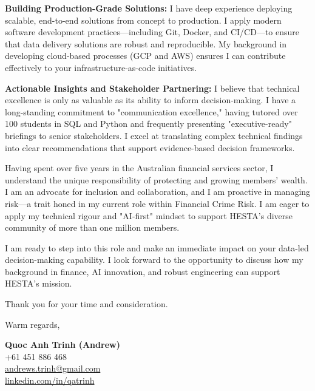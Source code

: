 \documentclass[11pt, a4paper]{article}
\begin{document}
\textbf{Building Production-Grade Solutions:}
I have deep experience deploying scalable, end-to-end solutions from concept to production. I apply modern software development practices—including Git, Docker, and CI/CD—to ensure that data delivery solutions are robust and reproducible. My background in developing cloud-based processes (GCP and AWS) ensures I can contribute effectively to your infrastructure-as-code initiatives.

\textbf{Actionable Insights and Stakeholder Partnering:}
I believe that technical excellence is only as valuable as its ability to inform decision-making. I have a long-standing commitment to "communication excellence," having tutored over 100 students in SQL and Python and frequently presenting "executive-ready" briefings to senior stakeholders. I excel at translating complex technical findings into clear recommendations that support evidence-based decision frameworks.

Having spent over five years in the Australian financial services sector, I understand the unique responsibility of protecting and growing members' wealth. I am an advocate for inclusion and collaboration, and I am proactive in managing risk—a trait honed in my current role within Financial Crime Risk. I am eager to apply my technical rigour and "AI-first" mindset to support HESTA's diverse community of more than one million members.

I am ready to step into this role and make an immediate impact on your data-led decision-making capability. I look forward to the opportunity to discuss how my background in finance, AI innovation, and robust engineering can support HESTA’s mission.

Thank you for your time and consideration.

\vspace{20pt}

Warm regards,

\vspace{30pt}

\textbf{Quoc Anh Trinh (Andrew)}\\
+61 451 886 468\\
\href{mailto:andrews.trinh@gmail.com}{andrews.trinh@gmail.com}\\
\href{https://www.linkedin.com/in/qatrinh}{linkedin.com/in/qatrinh}
\end{document}
